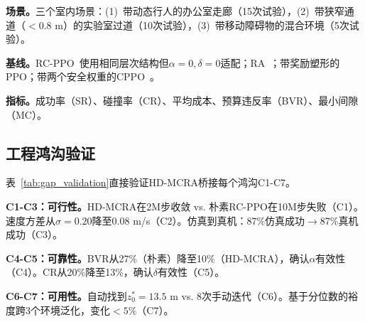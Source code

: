 \documentclass{article}
\begin{document}
\textbf{场景。}三个室内场景：(1)~带动态行人的办公室走廊（15次试验），(2)~带狭窄通道（$<0.8$ m）的实验室过道（10次试验），(3)~带移动障碍物的混合环境（5次试验）。

\textbf{基线。}RC-PPO~\citep{so2024}使用相同层次结构但$\alpha=0,\delta=0$适配；RA~\citep{hsu2021}；带奖励塑形的PPO；带两个安全权重的CPPO~\citep{achiam2017}。

\textbf{指标。}成功率（SR）、碰撞率（CR）、平均成本、预算违反率（BVR）、最小间隙（MC）。

\subsection{工程鸿沟验证}

表~\ref{tab:gap_validation}直接验证HD-MCRA桥接每个鸿沟C1-C7。

\textbf{C1-C3：可行性。}HD-MCRA在2M步收敛 vs. 朴素RC-PPO在10M步失败（C1）。速度方差从$\sigma=0.20$降至$0.08$ m/s（C2）。仿真到真机：87\%仿真成功$\to$87\%真机成功（C3）。

\textbf{C4-C5：可靠性。}BVR从27\%（朴素）降至10\%（HD-MCRA），确认$\alpha$有效性（C4）。CR从20\%降至13\%，确认$\delta$有效性（C5）。

\textbf{C6-C7：可用性。}自动找到$z_0^*=13.5$ m vs. 8次手动迭代（C6）。基于分位数的裕度跨3个环境泛化，变化$<5\%$（C7）。

\begin{table}[t]
\centering
\caption{工程鸿沟验证：HD-MCRA vs. 朴素RC-PPO（$\alpha=0,\delta=0$），跨30次真机试验。}
\label{tab:gap_validation}
\end{table}
\end{document}

